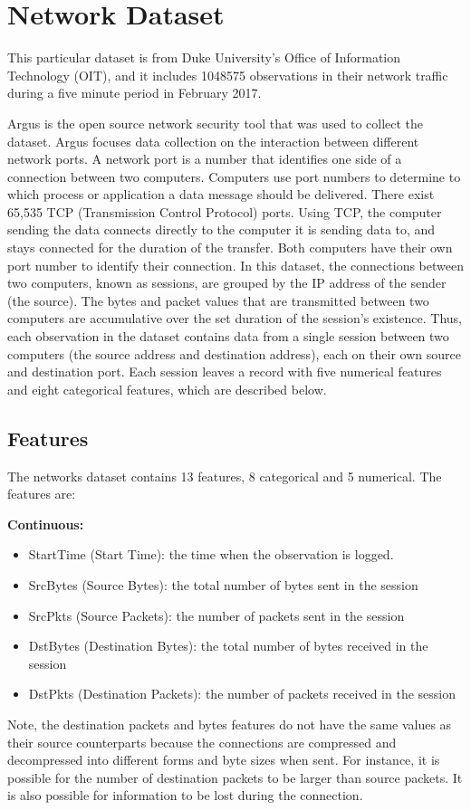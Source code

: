\documentclass[12pt,twoside]{dukestatscithesis}
\providecommand{\tightlist}{%
  \setlength{\itemsep}{0pt}\setlength{\parskip}{0pt}}
\theoremstyle{definition}
\theoremstyle{definition}
\theoremstyle{definition}
\theoremstyle{remark}
\begin{document}
\section{Network Dataset}\label{network-dataset}

This particular dataset is from Duke University's Office of Information
Technology (OIT), and it includes 1048575 observations in their network
traffic during a five minute period in February 2017.

Argus is the open source network security tool that was used to collect
the dataset. Argus focuses data collection on the interaction between
different network ports. A network port is a number that identifies one
side of a connection between two computers. Computers use port numbers
to determine to which process or application a data message should be
delivered. There exist 65,535 TCP (Transmission Control Protocol) ports.
Using TCP, the computer sending the data connects directly to the
computer it is sending data to, and stays connected for the duration of
the transfer. Both computers have their own port number to identify
their connection. In this dataset, the connections between two
computers, known as sessions, are grouped by the IP address of the
sender (the source). The bytes and packet values that are transmitted
between two computers are accumulative over the set duration of the
session's existence. Thus, each observation in the dataset contains data
from a single session between two computers (the source address and
destination address), each on their own source and destination port.
Each session leaves a record with five numerical features and eight
categorical features, which are described below.

\subsection{Features}\label{features}

The networks dataset contains 13 features, 8 categorical and 5
numerical. The features are:

\textbf{Continuous:}
\begin{itemize}
\tightlist
\item
  StartTime (Start Time): the time when the observation is logged.
\item
  SrcBytes (Source Bytes): the total number of bytes sent in the session
\item
  SrcPkts (Source Packets): the number of packets sent in the session
\item
  DstBytes (Destination Bytes): the total number of bytes received in
  the session
\item
  DstPkts (Destination Packets): the number of packets received in the
  session
\end{itemize}
Note, the destination packets and bytes features do not have the same
values as their source counterparts because the connections are
compressed and decompressed into different forms and byte sizes when
sent. For instance, it is possible for the number of destination packets
to be larger than source packets. It is also possible for information to
be lost during the connection.
\end{document}
